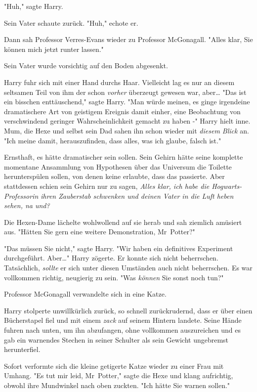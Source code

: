 {"Huh," sagte Harry.

Sein Vater schaute zurück. "Huh," echote er.

Dann sah Professor Verres-Evans wieder zu Professor McGonagall. "Alles klar, Sie können mich jetzt runter lassen."

Sein Vater wurde vorsichtig auf den Boden abgesenkt.

Harry fuhr sich mit einer Hand durchs Haar. Vielleicht lag es nur an diesem seltsamen Teil von ihm der schon \emph{vorher} überzeugt gewesen war, aber… "Das ist ein bisschen enttäuschend," sagte Harry. "Man würde meinen, es ginge irgendeine dramatischere Art von geistigem Ereignis damit einher, eine Beobachtung von verschwindend geringer Wahrscheinlichkeit gemacht zu haben -" Harry hielt inne. Mum, die Hexe und selbst sein Dad sahen ihn schon wieder mit \emph{diesem Blick} an. "Ich meine damit, herauszufinden, dass alles, was ich glaube, falsch ist."

Ernsthaft, es hätte dramatischer sein sollen. Sein Gehirn hätte seine komplette momentane Ansammlung von Hypothesen über das Universum die Toilette herunterspülen sollen, von denen keine erlaubte, dass das passierte. Aber stattdessen schien sein Gehirn nur zu sagen, \emph{Alles klar, ich habe die Hogwarts-Professorin ihren Zauberstab schwenken und deinen Vater in die Luft heben sehen, na und?}

Die Hexen-Dame lächelte wohlwollend auf sie herab und sah ziemlich amüsiert aus. "Hätten Sie gern eine weitere Demonstration, Mr~Potter?"

"Das müssen Sie nicht," sagte Harry. "Wir haben ein definitives Experiment durchgeführt. Aber…" Harry zögerte. Er konnte sich nicht beherrschen. Tatsächlich, \emph{sollte} er sich unter diesen Umständen auch nicht beherrschen. Es war vollkommen richtig, neugierig zu sein. "Was \emph{können} Sie sonst noch tun?"

Professor McGonagall verwandelte sich in eine Katze.

Harry stolperte unwillkürlich zurück, so schnell zurückrudernd, dass er über einen Bücherstapel fiel und mit einem \emph{zack} auf seinem Hintern landete. Seine Hände fuhren nach unten, um ihn abzufangen, ohne vollkommen auszureichen und es gab ein warnendes Stechen in seiner Schulter als sein Gewicht ungebremst herunterfiel.

Sofort verformte sich die kleine getigerte Katze wieder zu einer Frau mit Umhang. "Es tut mir leid, Mr~Potter," sagte die Hexe und klang aufrichtig, obwohl ihre Mundwinkel nach oben zuckten. "Ich hätte Sie warnen sollen."

}

